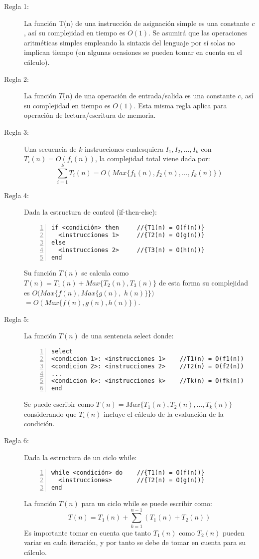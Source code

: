 \begin{description}
\item[Regla 1:] La función T(n) de una instrucción de asignación simple es una constante $c$, así su complejidad en tiempo es $O(1)$. Se asumirá que las operaciones aritméticas simples empleando la sintaxis del lenguaje por sí solas no implican tiempo (en algunas ocasiones se pueden tomar en cuenta en el cálculo).

\item[Regla 2:] La función $T(n$) de una operación de entrada/salida es una constante $c$, así su complejidad en tiempo es $O(1)$. Esta misma regla aplica para operación de lectura/escritura de memoria.

\item[Regla 3:] Una secuencia de $k$ instrucciones cualesquiera $I_1, I_2, \dots , I_k$ con $T_i(n) = O(f_i(n))$, la complejidad total viene dada por:
$$\sum_{i=1}^{k}{T_i(n)}=O(Max\{f_1(n), f_2(n), \dots, f_k(n)\})$$

\item[Regla 4:] Dada la estructura de control (if-then-else):
\begin{lstlisting}[upquote=true, language=pseudo, numbers=left]
if <condición> then		//{T1(n) = O(f(n))}
  <instrucciones 1>		//{T2(n) = O(g(n))}
else
  <instrucciones 2>		//{T3(n) = O(h(n))}
end
\end{lstlisting}
\noindent Su función $T(n)$ se calcula como $T(n) = T_1(n) + Max\{T_2(n), T_3(n)\}$ de esta forma su complejidad es $O(Max\{f(n), Max\{g(n),$ $h(n)\}\})$ $= O(Max\{f(n), g(n), h(n)\})$.

\item[Regla 5:] La función $T(n)$ de una sentencia select donde:
\begin{lstlisting}[upquote=true, language=pseudo, numbers=left]
select
<condicion 1>: <instrucciones 1>	//T1(n) = O(f1(n))
<condicion 2>: <instrucciones 2>	//T2(n) = O(f2(n))
...
<condicion k>: <instrucciones k>	//Tk(n) = O(fk(n))
end
\end{lstlisting}

Se puede escribir como $T(n) = Max\{T_1(n), T_2(n), \dots, T_k(n)\}$ considerando que $T_i(n)$ incluye el cálculo de la evaluación de la condición.

\item[Regla 6:] Dada la estructura de un ciclo while:
\begin{lstlisting}[upquote=true, language=pseudo, numbers=left]
while <condición> do	//{T1(n) = O(f(n))}
  <instrucciones>		//{T2(n) = O(g(n))}
end
\end{lstlisting}
La función $T(n)$ para un ciclo while se puede escribir como: 
$$T(n) = T_1(n) + \sum_{k=1}^{n-1}{(T_1(n) + T_2(n))}$$
Es importante tomar en cuenta que tanto $T_1(n)$ como $T_2(n)$ pueden variar en cada iteración, y por tanto se debe de tomar en cuenta para su cálculo.


\end{description}
